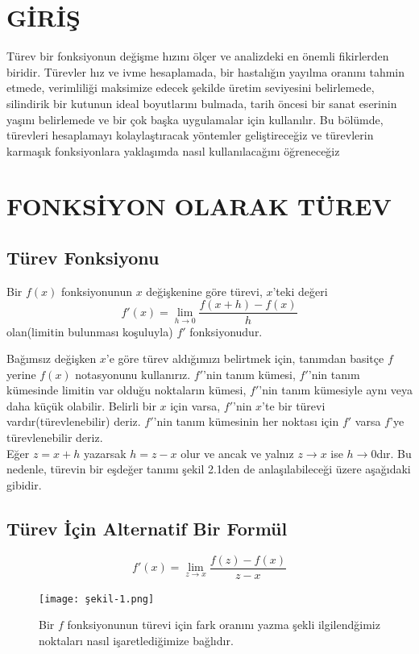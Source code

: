 \chapter{\protect GİRİŞ}
Türev bir fonksiyonun değişme hızını ölçer ve analizdeki en önemli fikirlerden biridir. Türevler hız ve ivme hesaplamada, bir hastalığın yayılma
oranını tahmin etmede, verimliliği maksimize edecek şekilde üretim seviyesini belirlemede, silindirik bir kutunun ideal boyutlarını bulmada, tarih öncesi bir sanat eserinin
yaşını belirlemede ve bir çok başka uygulamalar için kullanılır. Bu bölümde, türevleri
hesaplamayı kolaylaştıracak yöntemler geliştireceğiz ve türevlerin karmaşık fonksiyonlara
yaklaşımda nasıl kullanılacağını öğreneceğiz

\chapter{\protect FONKSİYON OLARAK TÜREV}
\section{\protect Türev Fonksiyonu} \label{bolumetiketi}
\begin{tanim}
	Bir $f(x)$ fonksiyonunun $x$ değişkenine göre türevi, $x$'teki değeri
\begin{equation*}
	f'(x) = \lim_{h \rightarrow 0} \frac{f(x + h)-f(x)}{h}
\end{equation*}
	olan(limitin bulunması koşuluyla) $f'$ fonksiyonudur.
\end{tanim}
	Bağımsız değişken $x$'e göre türev aldığımızı belirtmek için, tanımdan basitçe $f$ yerine $f(x)$ notasyonunu kullanırız. $f'$'nin tanım kümesi, $f'$'nin tanım kümesinde limitin var olduğu noktaların kümesi, $f'$'nin tanım kümesiyle aynı veya daha küçük olabilir. Belirli bir $x$ için varsa, $f'$'nin $x$'te bir türevi vardır(türevlenebilir) deriz. $f'$'nin tanım kümesinin her noktası için $f'$ varsa $f$'ye türevlenebilir deriz.\\
	Eğer $z=x+h$ yazarsak $h=z-x$ olur ve ancak ve yalnız $z\rightarrow x$ ise $h\rightarrow 0$dır. Bu nedenle, türevin bir eşdeğer tanımı şekil 2.1den de anlaşılabileceği üzere aşağıdaki gibidir.
\section{\protect Türev İçin Alternatif Bir Formül }\label{bolumetiketi}
\begin{equation*}
	f'(x) = \lim_{z \rightarrow x} \frac{f(z)-f(x)}{z-x}
\end{equation*}
\begin{figure}[H]	
	\centering
	\texttt{[image: şekil-1.png]}
	\caption{Bir $f$ fonksiyonunun türevi için fark oranını yazma şekli ilgilendğimiz noktaları nasıl işaretlediğimize bağlıdır.}
	\label{fig:ornekresim}
\end{figure}
